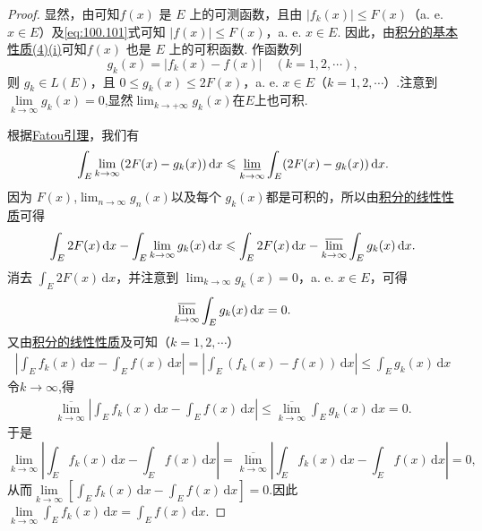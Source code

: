 \documentclass[../../main.tex]{subfiles}
\begin{document}
\begin{proof}
显然，由可知$f(x)$ 是 $E$ 上的可测函数，且由 $|f_k(x)| \leqslant F(x)$（a. e. $x \in E$）及\eqref{eq:100.101}式可知 $|f(x)| \leqslant F(x)$，a. e. $x \in E$. 因此，由\hyperref[theorem:积分的基本性质]{积分的基本性质(4)(i)}可知$f(x)$ 也是 $E$ 上的可积函数. 作函数列
\[
g_k(x) = |f_k(x) - f(x)| \quad (k = 1, 2, \cdots),
\]
则 $g_k \in L(E)$，且 $0 \leqslant g_k(x) \leqslant 2F(x)$，a. e. $x \in E$（$k = 1, 2, \cdots$）.注意到$\underset{k\rightarrow \infty}{\lim}g_k\left( x \right) =0$,显然$\lim_{k\to +\infty}g_k(x)$在$E$上也可积.

根据\hyperref[lemma:Fatou引理]{Fatou引理}，我们有
\[
\int_E \lim_{k \to \infty} (2F(x) - g_k(x)) \, \mathrm{d}x \leqslant \varliminf_{k \to \infty} \int_E (2F(x) - g_k(x)) \, \mathrm{d}x.
\]
因为 $F(x)$,$\lim_{n\to \infty}g_n(x)$以及每个 $g_k(x)$都是可积的，所以由\hyperref[theorem:积分的线性性质]{积分的线性性质}可得
\[
\int_E 2F(x) \, \mathrm{d}x - \int_E \lim_{k \to \infty} g_k(x) \, \mathrm{d}x \leqslant \int_E 2F(x) \, \mathrm{d}x - \varlimsup_{k \to \infty} \int_E g_k(x) \, \mathrm{d}x.
\]
消去 $\int_E 2F(x) \, \mathrm{d}x$，并注意到 $\lim_{k \to \infty} g_k(x) = 0$，a. e. $x \in E$，可得
\[
\varlimsup_{k \to \infty} \int_E g_k(x) \, \mathrm{d}x = 0.
\]
又由\hyperref[theorem:积分的线性性质]{积分的线性性质}及可知（$k = 1, 2, \cdots$）
\begin{align*}
\left| \int_E f_k(x) \, \mathrm{d}x - \int_E f(x) \, \mathrm{d}x \right| = \left| \int_E (f_k(x) - f(x)) \, \mathrm{d}x \right| 
\leqslant \int_E g_k(x) \, \mathrm{d}x
\end{align*}
令$k\to \infty$,得
\begin{align*}
\underset{k\rightarrow \infty}{\overline{\lim }}\left| \int_E{f_k(x)\,\mathrm{d}x}-\int_E{f(x)\,\mathrm{d}x} \right|\leqslant \underset{k\rightarrow \infty}{\overline{\lim }}\int_E{g_k(x)\,\mathrm{d}x}=0.
\end{align*}
于是$$\underset{k\rightarrow \infty}{\lim}\left| \int_E{f_k(x)\,\mathrm{d}x}-\int_E{f(x)\,\mathrm{d}x} \right|=\underset{k\rightarrow \infty}{\overline{\lim }}\left| \int_E{f_k(x)\,\mathrm{d}x}-\int_E{f(x)\,\mathrm{d}x} \right|=0,$$
从而$\underset{k\rightarrow \infty}{\lim}\left[ \int_E{f_k(x)\,\mathrm{d}x}-\int_E{f(x)\,\mathrm{d}x} \right] =0$.因此$\underset{k\rightarrow \infty}{\lim}\int_E{f_k(x)\,\mathrm{d}x}=\int_E{f(x)\,\mathrm{d}x}.$

\end{proof}
\end{document}
